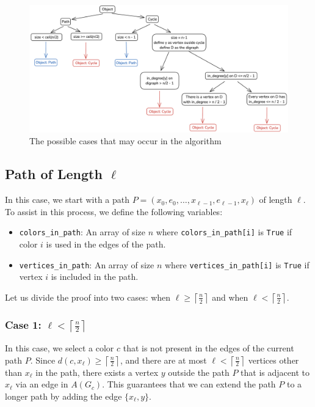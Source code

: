 \begin{figure}[H]
    \centering
    \includegraphics[width=1\textwidth]{figuras/flowchart_case.png}
    \caption{The possible cases that may occur in the algorithm}
    \label{fig:flowchart_cases}
\end{figure}

\subsection{Path of Length \( \ell \)}

In this case, we start with a path \( P = (x_0, e_0, \dots, x_{\ell-1}, e_{\ell-1}, x_{\ell}) \) of length \( \ell \). 
To assist in this process, we define the following variables:

\begin{itemize}
    \item \texttt{colors\_in\_path}: An array of size \( n \) where \texttt{colors\_in\_path[i]} is \texttt{True} if color \( i \) is used in the edges of the path.
    \item \texttt{vertices\_in\_path}: An array of size \( n \) where \texttt{vertices\_in\_path[i]} is \texttt{True} if vertex \( i \) is included in the path.
\end{itemize}

Let us divide the proof into two cases: when \( \ell \geq \left \lceil \frac{n}{2} \right \rceil \) and when \( \ell < \left \lceil \frac{n}{2} \right \rceil \).

\subsubsection{Case 1: \( \ell < \left \lceil \frac{n}{2} \right \rceil \)}

In this case, we select a color \( c \) that is not present in 
the edges of the current path $P$. Since 
\( d(c, x_{\ell}) \geq \left \lceil \frac{n}{2} \right \rceil \),
and there are at most 
\( \ell < \left \lceil \frac{n}{2} \right \rceil \)
vertices other than $x_{\ell}$ in the path, there exists a vertex 
\( y \) 
outside the path $P$ that is adjacent to 
\( x_{\ell} \) via an edge in $A(G_c)$. 
This guarantees that we can extend the path $P$ to a longer path by adding the edge $\{x_{\ell}, y\}$.


